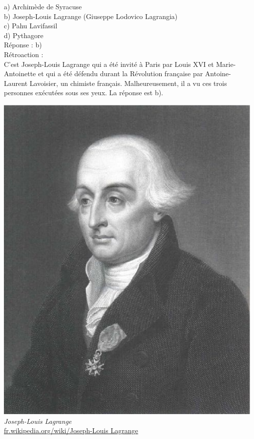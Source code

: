 \documentclass[letterpaper, 12pt]{article}
\begin{document}
a) Archim\`ede de Syracuse\\
b) Joseph-Louis Lagrange (Giuseppe Lodovico Lagrangia)\\
c) Pahu Lavifassil\\
d) Pythagore\\

R\'eponse : b)\\

R\'etroaction :\\
C'est Joseph-Louis Lagrange qui a \'et\'e invit\'e \`a Paris par Louis XVI et Marie-Antoinette et qui a \'et\'e d\'efendu durant la R\'evolution fran\c caise par Antoine-Laurent Lavoisier, un chimiste fran\c cais. Malheureusement, il a vu ces trois personnes ex\'ecut\'ees sous ses yeux. La r\'eponse est b).
\begin{center}
\includegraphics[scale=0.2]{Lagrange.eps}\\
\emph{{\small Joseph-Louis Lagrange}}\\
\href{http://fr.wikipedia.org/wiki/Joseph-Louis_Lagrange}{fr.wikipedia.org/wiki/Joseph-Louis Lagrange}\\[5mm]
\end{center}
\end{document}
